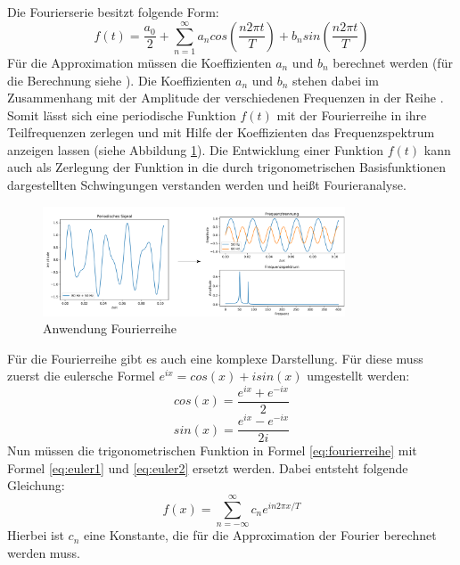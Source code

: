 Die Fourierserie besitzt folgende Form:
\begin{equation}
f(t) = \frac{a_0}{2} + \sum_{n=1}^{\infty} a_n cos \left( \frac{n2 \pi t}{T} \right) + b_n sin \left( \frac{n2 \pi t}{T} \right)
\label{eq:fourierreihe}
\end{equation}
Für die Approximation müssen die Koeffizienten $a_n$ und $b_n$ berechnet werden (für die Berechnung siehe \cite[K. 11.2]{krenor 11}). Die Koeffizienten $a_n$ und $b_n$ stehen dabei im Zusammenhang mit der Amplitude der verschiedenen Frequenzen in der Reihe \cite[K. 2.5]{scho 05}. Somit lässt sich eine periodische Funktion $f(t)$ mit der Fourierreihe in ihre Teilfrequenzen zerlegen und mit Hilfe der Koeffizienten das Frequenzspektrum anzeigen lassen (siehe Abbildung \ref{fig:fourierreihe}).
\newline
Die Entwicklung einer Funktion $f(t)$ kann auch als Zerlegung der Funktion in die durch trigonometrischen Basisfunktionen dargestellten Schwingungen verstanden werden und heißt Fourieranalyse.
\begin{figure}
\centering
 \includegraphics[width=0.8\textwidth]{Pictures/Fourierreihe.png}
\caption{Anwendung Fourierreihe}
\label{fig:fourierreihe}
\end{figure} 
\newline
Für die Fourierreihe gibt es auch eine komplexe Darstellung. Für diese muss zuerst die eulersche Formel $e^{ix} = cos(x) + i sin(x)$ umgestellt werden:
\begin{equation}
cos(x) = \frac{e^{ix} + e^{-ix}}{2}
\label{eq:euler1}
\end{equation}
\begin{equation}
sin(x) = \frac{e^{ix} - e^{-ix}}{2i}
\label{eq:euler2}
\end{equation}
Nun müssen die trigonometrischen Funktion in Formel \ref{eq:fourierreihe} mit Formel \ref{eq:euler1} und \ref{eq:euler2} ersetzt werden.
Dabei entsteht folgende Gleichung:
\begin{equation}
f(x) = \sum_{n=-\infty}^{\infty} c_{n} e^{in2\pi x / T}
\label{FS}
\end{equation}
Hierbei ist $c_n$ eine Konstante, die für die Approximation der Fourier berechnet werden muss.


